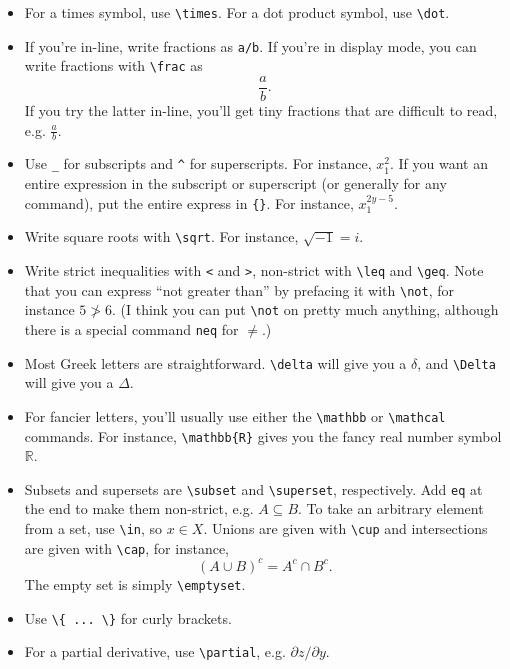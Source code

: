 \documentclass[12pt]{article}
\begin{document}
	\begin{itemize}
		\item For a times symbol, use \verb|\times|. For a dot product symbol, use \verb|\dot|. 
		
		\item If you're in-line, write fractions as \verb|a/b|. If you're in display mode, you can write fractions with \verb|\frac| as
			\[ \frac{a}{b}. \]
		If you try the latter in-line, you'll get tiny fractions that are difficult to read, e.g. $\frac{a}{b}$. 
		
		\item Use \verb|_| for subscripts and \verb|^| for superscripts. For instance, $x_1^2$. If you want an entire expression in the subscript or superscript (or generally for any command), put the entire express in \verb|{}|. For instance, $x_1^{2y-5}$. 
		
		\item Write square roots with \verb|\sqrt|. For instance, $\sqrt{-1}=i$. 
		
		\item Write strict inequalities with \verb|<| and \verb|>|, non-strict with \verb|\leq| and \verb|\geq|. Note that you can express ``not greater than'' by prefacing it with  \verb|\not|, for instance $5 \not > 6$. (I think you can put \verb|\not| on pretty much anything, although there is a special command \verb|neq| for $\neq$.)
		
		\item Most Greek letters are straightforward. \verb|\delta| will give you a $\delta$, and \verb|\Delta| will give you a $\Delta$. 
		
		\item For fancier letters, you'll usually use either the \verb|\mathbb| or \verb|\mathcal| commands. For instance, \verb|\mathbb{R}| gives you the fancy real number symbol $\mathbb{R}$.
		
		\item Subsets and supersets are \verb|\subset| and \verb|\superset|, respectively. Add \verb|eq| at the end to make them non-strict, e.g. $A \subseteq B$. To take an arbitrary element from a set, use \verb|\in|, so $x \in X$. Unions are given with \verb|\cup| and intersections are given with \verb|\cap|, for instance,  
			\[	(A \cup B)^c=A^c \cap B^c . \]
		The empty set is simply \verb|\emptyset|. 
		
		\item Use \verb|\{ ... \}| for curly brackets. 
		
		\item For a partial derivative, use \verb|\partial|, e.g. $\partial z/\partial y$. 
		

\end{itemize}
\end{document}
